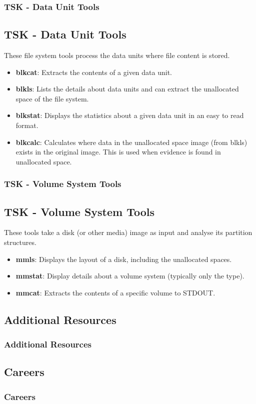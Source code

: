 \documentclass{beamer}
\begin{document}
\begin{frame}
	\frametitle{TSK - Data Unit Tools}
	\subsection*{TSK - Data Unit Tools}
	These file system tools process the data units where file content is stored.
	\begin{itemize}
		\item \textbf{blkcat}: Extracts the contents of a given data unit.
		\item \textbf{blkls}: Lists the details about data units and can extract the unallocated space of the file system.
		\item \textbf{blkstat}: Displays the statistics about a given data unit in an easy to read format.
		\item \textbf{blkcalc}: Calculates where data in the unallocated space image (from blkls) exists in the original image. This is used when evidence is found in unallocated space.
	\end{itemize}
\end{frame}

\begin{frame}
	\frametitle{TSK - Volume System Tools}
	\subsection*{TSK - Volume System Tools}
	These tools take a disk (or other media) image as input and analyse its partition structures. 
	\begin{itemize}
		\item \textbf{mmls}: Displays the layout of a disk, including the unallocated spaces.
		\item \textbf{mmstat}: Display details about a volume system (typically only the type).
		\item \textbf{mmcat}: Extracts the contents of a specific volume to STDOUT.
	\end{itemize}
\end{frame}


\begin{frame}
	\section{Additional Resources}
	\frametitle{Additional Resources}
	
\end{frame}

\begin{frame}
	\section{Careers}
	\frametitle{Careers}
	
\end{frame}
\end{document}
